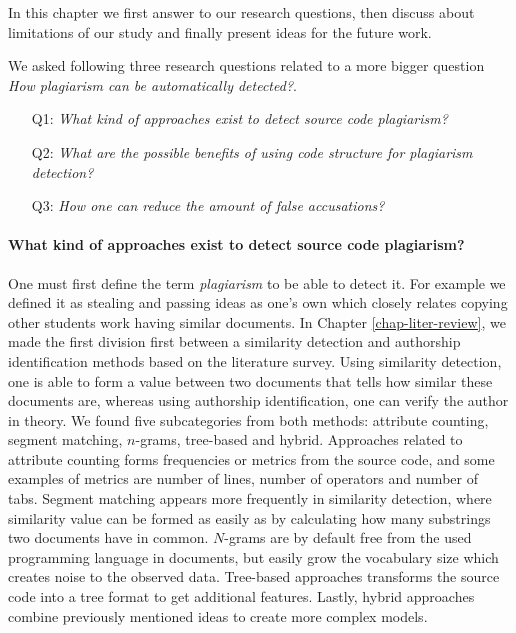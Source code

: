 In this chapter we first answer to our research questions, then discuss about limitations of our study and finally present ideas for the future work.

We asked following three research questions related to a more bigger question \emph{How plagiarism can be automatically detected?}.

\begin{itemize}
    \item[Q1:] \emph{What kind of approaches exist to detect source code plagiarism?}
    \item[Q2:] \emph{What are the possible benefits of using code structure for plagiarism detection?}
    \item[Q3:] \emph{How one can reduce the amount of false accusations?}
\end{itemize}

\paragraph{What kind of approaches exist to detect source code plagiarism?}
One must first define the term \emph{plagiarism} to be able to detect it. For example we defined it as stealing and passing ideas as one's own which closely relates copying other students work \ie having similar documents. In Chapter \ref{chap-liter-review}, we made the first division first between a similarity detection and authorship identification methods based on the literature survey. Using similarity detection, one is able to form a value between two documents that tells how similar these documents are, whereas using authorship identification, one can verify the author in theory. We found five subcategories from both methods: attribute counting, segment matching, $n$-grams, tree-based and hybrid. Approaches related to attribute counting forms frequencies or metrics from the source code, and some examples of metrics are number of lines, number of operators and number of tabs. Segment matching appears more frequently in similarity detection, where similarity value can be formed as easily as by calculating how many substrings two documents have in common. $N$-grams are by default free from the used programming language in documents, but easily grow the vocabulary size which creates noise to the observed data. Tree-based approaches transforms the source code into a tree format to get additional features. Lastly, hybrid approaches combine previously mentioned ideas to create more complex models. 

